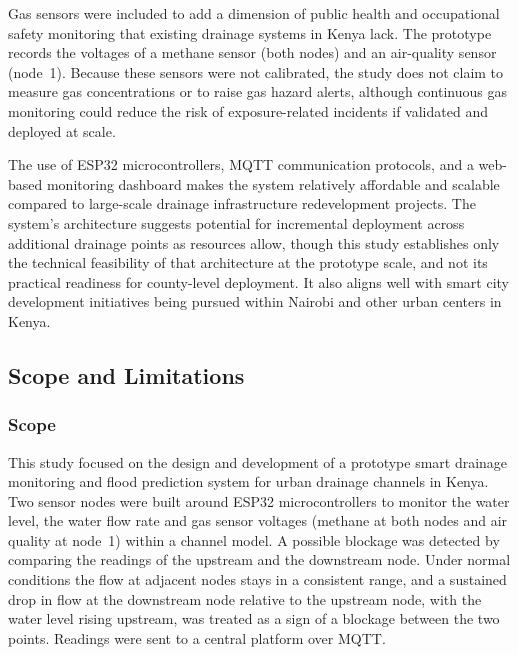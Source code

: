 \documentclass[12pt, a4paper]{article}
\begin{document}
Gas sensors were included to add a dimension of public health and occupational safety monitoring that existing drainage systems in Kenya lack. The prototype records the voltages of a methane sensor (both nodes) and an air-quality sensor (node~1). Because these sensors were not calibrated, the study does not claim to measure gas concentrations or to raise gas hazard alerts, although continuous gas monitoring could reduce the risk of exposure-related incidents if validated and deployed at scale.

The use of ESP32 microcontrollers, MQTT communication protocols, and a web-based monitoring dashboard makes the system relatively affordable and scalable compared to large-scale drainage infrastructure redevelopment projects. The system's architecture suggests potential for incremental deployment across additional drainage points as resources allow, though this study establishes only the technical feasibility of that architecture at the prototype scale, and not its practical readiness for county-level deployment. It also aligns well with smart city development initiatives being pursued within Nairobi and other urban centers in Kenya.


\subsection{Scope and Limitations}
\subsubsection{Scope}
\label{sec:scope}

This study focused on the design and development of a prototype smart drainage monitoring and flood prediction system for urban drainage channels in Kenya. Two sensor nodes were built around ESP32 microcontrollers to monitor the water level, the water flow rate and gas sensor voltages (methane at both nodes and air quality at node~1) within a channel model. A possible blockage was detected by comparing the readings of the upstream and the downstream node. Under normal conditions the flow at adjacent nodes stays in a consistent range, and a sustained drop in flow at the downstream node relative to the upstream node, with the water level rising upstream, was treated as a sign of a blockage between the two points. Readings were sent to a central platform over MQTT.
\end{document}
